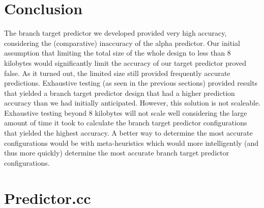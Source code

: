 \documentclass[twocolumn]{article}
\begin{document}
\section{Conclusion}
The branch target predictor we developed provided very high accuracy,
considering the (comparative) inaccuracy of the alpha predictor. Our
initial assumption that limiting the total size of the whole design to
less than 8 kilobytes would significantly limit the accuracy of our
target predictor proved false.  As it turned out, the limited size
still provided frequently accurate predictions.  Exhaustive testing
(as seen in the previous sections) provided results that yielded a
branch target predictor design that had a higher prediction accuracy
than we had initially anticipated.  However, this solution is not
scaleable. Exhaustive testing beyond 8 kilobytes will not scale well
considering the large amount of time it took to calculate the branch
target predictor configurations that yielded the highest accuracy.  A
better way to determine the most accurate configurations would be with
meta-heuristics which would more intelligently (and thus more quickly)
determine the most accurate branch target predictor configurations.


\newpage
\onecolumn
\appendix
\section*{Predictor.cc}

\end{document}
